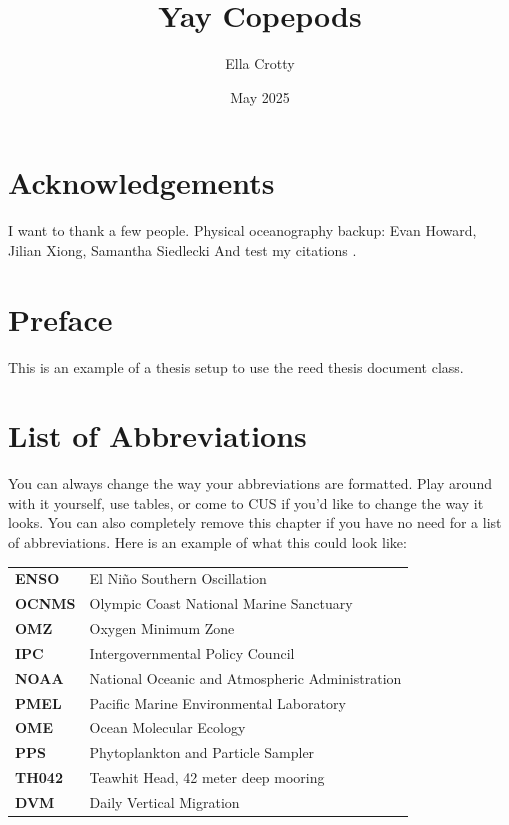 \documentclass[12pt,twoside]{reedthesis}
\title{Yay Copepods}
\author{Ella Crotty}
\date{May 2025}
\begin{document}
  \maketitle
  \frontmatter %
  \pagestyle{empty} %

    \chapter*{Acknowledgements}
	I want to thank a few people. 
	Physical oceanography backup: Evan Howard, Jilian Xiong, Samantha Siedlecki
	And test my citations \autocite{Barth2024}.

    \chapter*{Preface}
	This is an example of a thesis setup to use the reed thesis document class.
	
    \chapter*{List of Abbreviations}
		You can always change the way your abbreviations are formatted. Play around with it yourself, use tables, or come to CUS if you'd like to change the way it looks. You can also completely remove this chapter if you have no need for a list of abbreviations. Here is an example of what this could look like:

	\begin{table}[h]
	\centering %
	\begin{tabular}{ll}
		\textbf{ENSO}  	&  El Ni\~{n}o Southern Oscillation \\
		\textbf{OCNMS}  	&  Olympic Coast National Marine Sanctuary \\
		\textbf{OMZ}  	&  Oxygen Minimum Zone \\
		\textbf{IPC}  	&  Intergovernmental Policy Council \\
		\textbf{NOAA}  	&  National Oceanic and Atmospheric Administration \\
		\textbf{PMEL}  	&  Pacific Marine Environmental Laboratory \\
		\textbf{OME}  	&  Ocean Molecular Ecology \\
		\textbf{PPS}  	&  Phytoplankton and Particle Sampler \\
		\textbf{TH042}  	&  Teawhit Head, 42 meter deep mooring \\
		\textbf{DVM}  	&  Daily Vertical Migration \\
	\end{tabular}
	\end{table}
	
\end{document}
